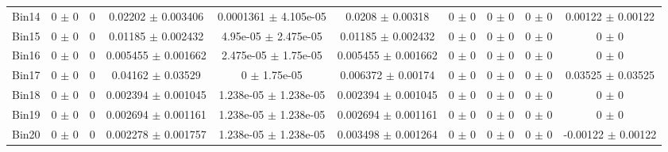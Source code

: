 \begin{tabular}{@{\extracolsep{4pt}}lccccccccc@{}}
     Bin14 & 0 $\pm$ 0 & 0 & 0.02202 $\pm$ 0.003406 & 0.0001361 $\pm$ 4.105e-05 & 0.0208 $\pm$ 0.00318 & 0 $\pm$ 0 & 0 $\pm$ 0 & 0 $\pm$ 0 & 0.00122 $\pm$ 0.00122 \\ 
     Bin15 & 0 $\pm$ 0 & 0 & 0.01185 $\pm$ 0.002432 & 4.95e-05 $\pm$ 2.475e-05 & 0.01185 $\pm$ 0.002432 & 0 $\pm$ 0 & 0 $\pm$ 0 & 0 $\pm$ 0 & 0 $\pm$ 0 \\ 
     Bin16 & 0 $\pm$ 0 & 0 & 0.005455 $\pm$ 0.001662 & 2.475e-05 $\pm$ 1.75e-05 & 0.005455 $\pm$ 0.001662 & 0 $\pm$ 0 & 0 $\pm$ 0 & 0 $\pm$ 0 & 0 $\pm$ 0 \\ 
     Bin17 & 0 $\pm$ 0 & 0 & 0.04162 $\pm$ 0.03529 & 0 $\pm$ 1.75e-05 & 0.006372 $\pm$ 0.00174 & 0 $\pm$ 0 & 0 $\pm$ 0 & 0 $\pm$ 0 & 0.03525 $\pm$ 0.03525 \\ 
     Bin18 & 0 $\pm$ 0 & 0 & 0.002394 $\pm$ 0.001045 & 1.238e-05 $\pm$ 1.238e-05 & 0.002394 $\pm$ 0.001045 & 0 $\pm$ 0 & 0 $\pm$ 0 & 0 $\pm$ 0 & 0 $\pm$ 0 \\ 
     Bin19 & 0 $\pm$ 0 & 0 & 0.002694 $\pm$ 0.001161 & 1.238e-05 $\pm$ 1.238e-05 & 0.002694 $\pm$ 0.001161 & 0 $\pm$ 0 & 0 $\pm$ 0 & 0 $\pm$ 0 & 0 $\pm$ 0 \\ 
     Bin20 & 0 $\pm$ 0 & 0 & 0.002278 $\pm$ 0.001757 & 1.238e-05 $\pm$ 1.238e-05 & 0.003498 $\pm$ 0.001264 & 0 $\pm$ 0 & 0 $\pm$ 0 & 0 $\pm$ 0 & -0.00122 $\pm$ 0.00122 \\ 
\hline\hline
  \end{tabular}

